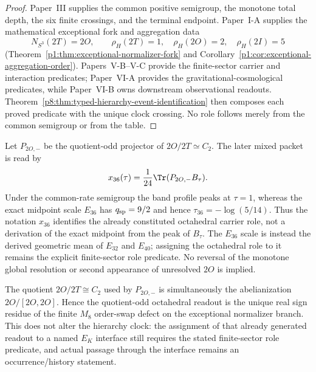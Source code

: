 \documentclass[12pt,a4paper]{article}
\begin{document}
\begin{proof}
Paper~III supplies the common positive semigroup, the monotone total depth, the six finite crossings, and the terminal endpoint.  Paper~I-A supplies the mathematical exceptional fork and aggregation data
\[
N_{S^3}(2T)=2O,\qquad
\rho_H(2T)=1,\quad\rho_H(2O)=2,\quad\rho_H(2I)=5
\]
(Theorem~\ref{p1:thm:exceptional-normalizer-fork} and Corollary~\ref{p1:cor:exceptional-aggregation-order}).  Papers~V-B--V-C provide the finite-sector carrier and interaction predicates; Paper~VI-A provides the gravitational-cosmological predicates, while Paper~VI-B owns downstream observational readouts.  Theorem~\ref{p8:thm:typed-hierarchy-event-identification} then composes each proved predicate with the unique clock crossing.  No role follows merely from the common semigroup or from the table.
\end{proof}

\begin{remark}
Let \(P_{2O,-}\) be the quotient-odd projector of \(2O/2T\simeq C_2\).  The later mixed packet is read by
\[
x_{36}(\tau)=\frac1{24}\Tr(P_{2O,-}B_\tau).
\]
Under the common-rate semigroup the band profile peaks at \(\tau=1\), whereas
the exact midpoint scale \(E_{36}\) has \(q_{\rm sp}=9/2\) and hence
\(\tau_{36}=-\log(5/14)\).  Thus the notation \(x_{36}\) identifies the
already constituted octahedral carrier role, not a derivation of the exact
midpoint from the peak of \(B_\tau\).  The \(E_{36}\) scale is instead the
derived geometric mean of \(E_{32}\) and \(E_{40}\); assigning the octahedral
role to it remains the explicit finite-sector role predicate.  No reversal of
the monotone global resolution or second appearance of unresolved \(2O\) is
implied.
\end{remark}

\begin{remark}
\label{p8:rem:v188-octahedral-defect-residue}
The quotient $2O/2T\cong C_2$ used by $P_{2O,-}$ is simultaneously the
abelianization $2O/[2O,2O]$.  Hence the quotient-odd octahedral readout is the
unique real sign residue of the finite $M_8$ order-swap defect on the
exceptional normalizer branch.  This does not alter the hierarchy clock:
the assignment of that already generated readout to a named $E_K$ interface
still requires the stated finite-sector role predicate, and actual passage
through the interface remains an occurrence/history statement.
\end{remark}
\end{document}
